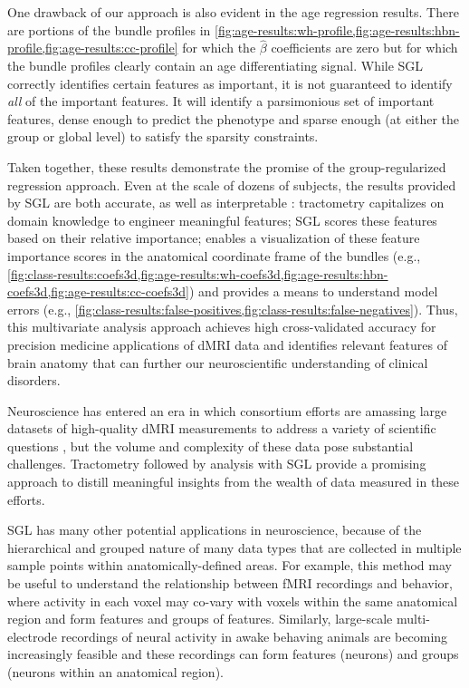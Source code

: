 \documentclass[10pt,letterpaper]{article}
\begin{document}
One drawback of our approach is also evident in the age regression results.
There are portions of the bundle profiles in
\cref{fig:age-results:wh-profile,fig:age-results:hbn-profile,fig:age-results:cc-profile}
for which the $\hat{\beta}$ coefficients are zero but for which the bundle
profiles clearly contain an age differentiating signal. While SGL correctly
identifies certain features as important, it is not guaranteed to identify
\emph{all} of the important features. It will identify a parsimonious set of
important features, dense enough to predict the phenotype and sparse enough
(at either the group or global level) to satisfy the sparsity constraints.

Taken together, these results demonstrate the promise of the
group-regularized regression approach. Even at the scale of dozens of
subjects, the results provided by SGL are both accurate, as well as
interpretable \cite{Murdoch2019-ax}: tractometry capitalizes on domain
knowledge to engineer meaningful features; SGL scores these features based on
their relative importance; enables a visualization of these feature
importance scores in the anatomical coordinate frame of the bundles (e.g.,
\cref{fig:class-results:coefs3d,fig:age-results:wh-coefs3d,fig:age-results:hbn-coefs3d,fig:age-results:cc-coefs3d})
and provides a means to understand model errors (e.g.,
\cref{fig:class-results:false-positives,fig:class-results:false-negatives}).
Thus, this multivariate analysis approach achieves high cross-validated
accuracy for precision medicine applications of dMRI data and identifies
relevant features of brain anatomy that can further our neuroscientific
understanding of clinical disorders.

Neuroscience has entered an era in which consortium efforts are amassing
large datasets of high-quality dMRI measurements to address a variety of
scientific questions \cite{jernigan2016ping, jernigan2018abcd,
alexander2017open, Miller2016-hw, VanEssen2012}, but the volume and
complexity of these data pose substantial challenges. Tractometry followed by
analysis with SGL provide a promising approach to distill meaningful insights
from the wealth of data measured in these efforts.

SGL has many other potential applications in neuroscience, because of the
hierarchical and grouped nature of many data types that are collected in
multiple sample points within anatomically-defined areas. For example, this
method may be useful to understand the relationship between fMRI recordings
and behavior, where activity in each voxel may co-vary with voxels within the
same anatomical region and form features and groups of features. Similarly,
large-scale multi-electrode recordings of neural activity in awake behaving
animals are becoming increasingly feasible \cite{steinmetz2018distributed,
Jun2017-gv} and these recordings can form features (neurons) and groups
(neurons within an anatomical region).
\end{document}
